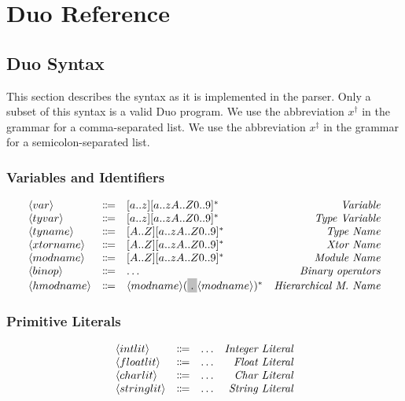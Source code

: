 \documentclass[11pt]{article}
\newcommand{\nonterminal}[1]{\langle #1 \rangle}
\newcommand{\terminal}[1]{\colorbox{lightgray}{\vphantom{X}#1}}
\newcommand{\commalist}[1]{#1^{\dagger}}
\newcommand{\semicolonlist}[1]{#1^{\ddagger}}
\begin{document}
\section{Duo Reference}

\subsection{Duo Syntax}
This section describes the syntax as it is implemented in the parser.
Only a subset of this syntax is a valid Duo program.
We use the abbreviation $\commalist{x}$ in the grammar for a comma-separated list.
We use the abbreviation $\semicolonlist{x}$ in the grammar for a semicolon-separated list.

\subsubsection{Variables and Identifiers}
\[
  \begin{array}{lclr}
    \nonterminal{var} & \Coloneqq & [a..z][a..zA..Z0..9]^{\ast} & \emph{Variable} \\
    \nonterminal{tyvar} & \Coloneqq & [a..z][a..zA..Z0..9]^{\ast} & \emph{Type Variable} \\
    \nonterminal{tyname} & \Coloneqq & [A..Z][a..zA..Z0..9]^{\ast} & \emph{Type Name} \\
    \nonterminal{xtorname} & \Coloneqq & [A..Z][a..zA..Z0..9]^{\ast} & \emph{Xtor Name} \\
    \nonterminal{modname} & \Coloneqq &  [A..Z][a..zA..Z0..9]^{\ast} & \emph{Module Name} \\
    \nonterminal{binop} & \Coloneqq & \ldots & \emph{Binary operators} \\
    \nonterminal{hmodname} & \Coloneqq & \nonterminal{modname}(\terminal{.}\nonterminal{modname})^{\ast} & \emph{Hierarchical M. Name}
  \end{array}
\]

\subsubsection{Primitive Literals}
\[
  \begin{array}{lclr}
    \nonterminal{intlit} & \Coloneqq & \ldots & \emph{Integer Literal} \\
    \nonterminal{floatlit} & \Coloneqq & \ldots & \emph{Float Literal} \\
    \nonterminal{charlit} & \Coloneqq & \ldots & \emph{Char Literal} \\
    \nonterminal{stringlit} & \Coloneqq & \ldots & \emph{String Literal} \\
  \end{array}
\]
\end{document}
